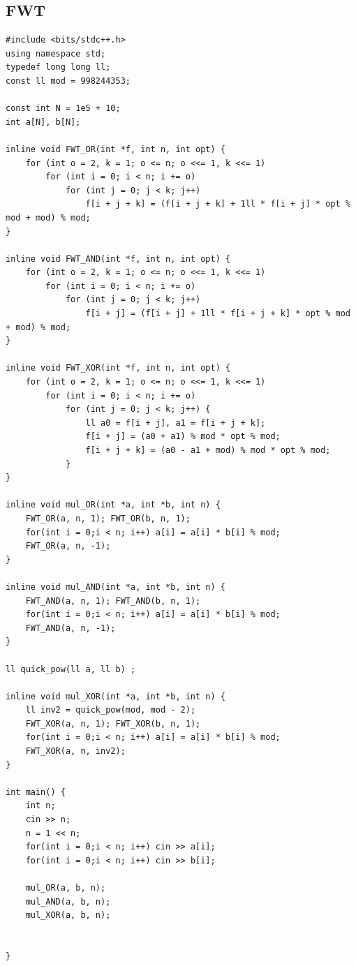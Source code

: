 \documentclass[twoside]{article}
\begin{document}
\subsection{FWT}
\begin{lstlisting}
#include <bits/stdc++.h>
using namespace std;
typedef long long ll;
const ll mod = 998244353;

const int N = 1e5 + 10;
int a[N], b[N];

inline void FWT_OR(int *f, int n, int opt) {
    for (int o = 2, k = 1; o <= n; o <<= 1, k <<= 1)
        for (int i = 0; i < n; i += o)
            for (int j = 0; j < k; j++)
                f[i + j + k] = (f[i + j + k] + 1ll * f[i + j] * opt % mod + mod) % mod;
}

inline void FWT_AND(int *f, int n, int opt) {
    for (int o = 2, k = 1; o <= n; o <<= 1, k <<= 1)
        for (int i = 0; i < n; i += o)
            for (int j = 0; j < k; j++)
                f[i + j] = (f[i + j] + 1ll * f[i + j + k] * opt % mod + mod) % mod;
}

inline void FWT_XOR(int *f, int n, int opt) {
    for (int o = 2, k = 1; o <= n; o <<= 1, k <<= 1)
        for (int i = 0; i < n; i += o)
            for (int j = 0; j < k; j++) {
                ll a0 = f[i + j], a1 = f[i + j + k];
                f[i + j] = (a0 + a1) % mod * opt % mod;
                f[i + j + k] = (a0 - a1 + mod) % mod * opt % mod;
            }
}

inline void mul_OR(int *a, int *b, int n) {
    FWT_OR(a, n, 1); FWT_OR(b, n, 1);
    for(int i = 0;i < n; i++) a[i] = a[i] * b[i] % mod;
    FWT_OR(a, n, -1);
}

inline void mul_AND(int *a, int *b, int n) {
    FWT_AND(a, n, 1); FWT_AND(b, n, 1);
    for(int i = 0;i < n; i++) a[i] = a[i] * b[i] % mod;
    FWT_AND(a, n, -1);
}

ll quick_pow(ll a, ll b) ;

inline void mul_XOR(int *a, int *b, int n) {
    ll inv2 = quick_pow(mod, mod - 2);
    FWT_XOR(a, n, 1); FWT_XOR(b, n, 1);
    for(int i = 0;i < n; i++) a[i] = a[i] * b[i] % mod;
    FWT_XOR(a, n, inv2);
}

int main() {
    int n;
    cin >> n;
    n = 1 << n;
    for(int i = 0;i < n; i++) cin >> a[i];
    for(int i = 0;i < n; i++) cin >> b[i];
    
    mul_OR(a, b, n);
    mul_AND(a, b, n);
    mul_XOR(a, b, n);


}\end{lstlisting}
\end{document}
